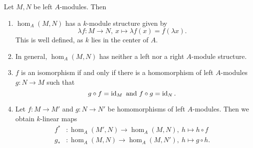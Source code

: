 \begin{rem}
  Let $M,N$ be left $A$-modules. Then
  \begin{enumerate}
    \item $\hom_A(M,N)$ has a $k$-module structure given by
    \[
    \lambda f:M\to N,~x\mapsto \lambda f(x) = f(\lambda x).
    \]
    This is well defined, as $k$ lies in the center of $A$.
    \item In general, $\hom_A(M,N)$ has neither a left nor a right $A$-module structure.
    \item $f$ is an isomorphism if and only if there is a homomorphism of left $A$-modules $g:N\to M$ such that
    \[
    g\circ f = \operatorname{id}_{M}~\text{and}~f\circ g = \operatorname{id}_{N}.
    \]
    \item Let $f:M\to M'$ and $g:N\to N'$ be \color{purple}homomorphisms of left $A$-modules\color{black}. Then we obtain $k$-linear maps
    \begin{align*}
      f^\ast &:\hom_A(M',N)\to \hom_A(M,N),~h\mapsto h\circ f\\
      g_{\ast} &: \hom_A(M,N) \to \hom_A(M,N'),~h\mapsto g\circ h.
    \end{align*}
  \end{enumerate}
\end{rem}
